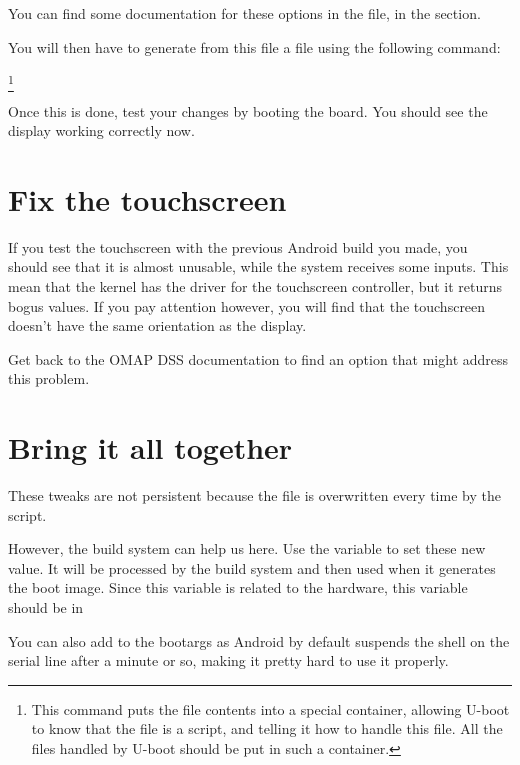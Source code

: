 You can find some documentation for these options in the
 file, in the
 section.

You will then have to generate from this  file a
 file using the following command:

\footnote{This command puts the  file contents into a
  special container, allowing U-boot to know that the 
  file is a script, and telling it how to handle this file. All the
  files handled by U-boot should be put in such a container.}
 
Once this is done, test your changes by booting the board. You should
see the display working correctly now.

\section{Fix the touchscreen}

If you test the touchscreen with the previous Android build you made,
you should see that it is almost unusable, while the system receives
some inputs. This mean that the kernel has the driver for the
touchscreen controller, but it returns bogus values. If you pay
attention however, you will find that the touchscreen doesn't have the
same orientation as the display.

Get back to the OMAP DSS documentation to find an option that might
address this problem.

\section{Bring it all together}

These tweaks are not persistent because the  file is
overwritten every time by the 
script.

However, the build system can help us here. Use the
 variable to set these new value. It will
be processed by the build system and then used when it generates the
boot image. Since this variable is related to the hardware, this
variable should be in 

You can also add  to the bootargs as Android
by default suspends the shell on the serial line after a minute or so,
making it pretty hard to use it properly.


